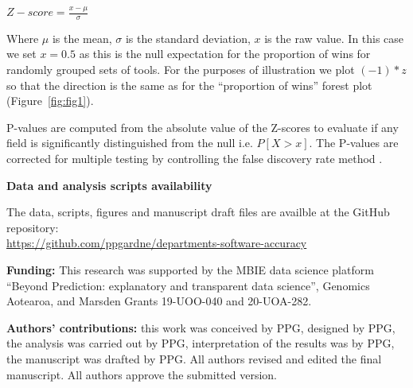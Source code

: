 \documentclass[fleqn,10pt,doc,onecolumn]{SelfArx}%
\begin{document}
$Z-score=\frac{x-\mu}{\sigma}$

Where $\mu$ is the mean, $\sigma$ is the standard deviation, $x$ is the raw
value. In this case we set $x=0.5$ as this is the null expectation for
the proportion of wins for randomly grouped sets of tools. For the
purposes of illustration we plot $(-1)*z$ so that the direction is the
same as for the ``proportion of wins'' forest plot
(Figure~\ref{fig:fig1}). 

P-values are computed from the absolute value of the Z-scores to
evaluate if any field is significantly distinguished from the null
i.e. $P[X > x]$. The P-values are corrected for multiple testing by
controlling the false discovery rate method
\cite{benjamini1995controlling}.


\noindent\textbf{Data and analysis scripts availability}

The data, scripts, figures and manuscript draft files are availble at the GitHub repository:\\
\href{https://github.com/ppgardne/departments-software-accuracy}{https://github.com/ppgardne/departments-software-accuracy}

\noindent\textbf{Funding:} This research was supported by the MBIE data
science platform ``Beyond Prediction: explanatory and transparent data
science'', Genomics Aotearoa, and Marsden
Grants 19-UOO-040 and 20-UOA-282.

\noindent\textbf{Authors' contributions:} this work was conceived by 
PPG, designed by PPG, the analysis was carried out by PPG, interpretation of the results was by PPG,
the manuscript was drafted by  PPG.
All authors revised and edited the final manuscript. All authors approve the submitted version. 



\end{document}
